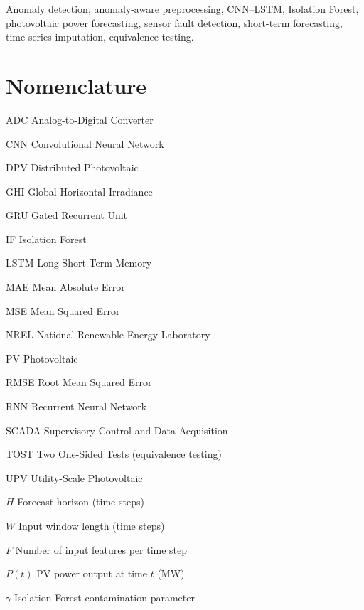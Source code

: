 \documentclass[conference]{IEEEtran}
\begin{document}
\begin{IEEEkeywords}
Anomaly detection, anomaly-aware preprocessing, CNN--LSTM, Isolation Forest, photovoltaic power forecasting, sensor fault detection, short-term forecasting, time-series imputation, equivalence testing.
\end{IEEEkeywords}

\section*{Nomenclature}

\noindent
\begin{IEEEdescription}
\item[ADC] Analog-to-Digital Converter
\item[CNN] Convolutional Neural Network
\item[DPV] Distributed Photovoltaic
\item[GHI] Global Horizontal Irradiance
\item[GRU] Gated Recurrent Unit
\item[IF] Isolation Forest
\item[LSTM] Long Short-Term Memory
\item[MAE] Mean Absolute Error
\item[MSE] Mean Squared Error
\item[NREL] National Renewable Energy Laboratory
\item[PV] Photovoltaic
\item[RMSE] Root Mean Squared Error
\item[RNN] Recurrent Neural Network
\item[SCADA] Supervisory Control and Data Acquisition
\item[TOST] Two One-Sided Tests (equivalence testing)
\item[UPV] Utility-Scale Photovoltaic
\item[$H$] Forecast horizon (time steps)
\item[$W$] Input window length (time steps)
\item[$F$] Number of input features per time step
\item[$P(t)$] PV power output at time $t$ (MW)
\item[$\gamma$] Isolation Forest contamination parameter
\end{IEEEdescription}

\end{document}
